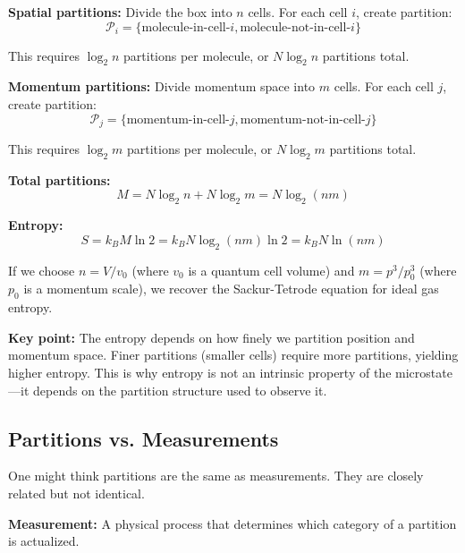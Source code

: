 \documentclass[twocolumn,10pt]{article}
\theoremstyle{definition}
\theoremstyle{remark}
\begin{document}
\vspace{0.2cm}
\noindent\textbf{Spatial partitions:} Divide the box into $n$ cells. For each cell $i$, create partition:
\begin{equation}
\mathcal{P}_i = \{\text{molecule-in-cell-}i, \text{molecule-not-in-cell-}i\}
\end{equation}

This requires $\log_2 n$ partitions per molecule, or $N \log_2 n$ partitions total.

\vspace{0.2cm}
\noindent\textbf{Momentum partitions:} Divide momentum space into $m$ cells. For each cell $j$, create partition:
\begin{equation}
\mathcal{P}_j = \{\text{momentum-in-cell-}j, \text{momentum-not-in-cell-}j\}
\end{equation}

This requires $\log_2 m$ partitions per molecule, or $N \log_2 m$ partitions total.

\vspace{0.2cm}
\noindent\textbf{Total partitions:}
\begin{equation}
M = N \log_2 n + N \log_2 m = N \log_2(nm)
\end{equation}

\noindent\textbf{Entropy:}
\begin{equation}
S = k_B M \ln 2 = k_B N \log_2(nm) \ln 2 = k_B N \ln(nm)
\end{equation}

\noindent If we choose $n = V/v_0$ (where $v_0$ is a quantum cell volume) and $m = p^3/p_0^3$ (where $p_0$ is a momentum scale), we recover the Sackur-Tetrode equation for ideal gas entropy.

\vspace{0.2cm}
\noindent\textbf{Key point:} The entropy depends on how finely we partition position and momentum space. Finer partitions (smaller cells) require more partitions, yielding higher entropy. This is why entropy is not an intrinsic property of the microstate—it depends on the partition structure used to observe it.

\subsection{Partitions vs. Measurements}

One might think partitions are the same as measurements. They are closely related but not identical.

\vspace{0.2cm}
\noindent\textbf{Measurement:} A physical process that determines which category of a partition is actualized.
\end{document}
